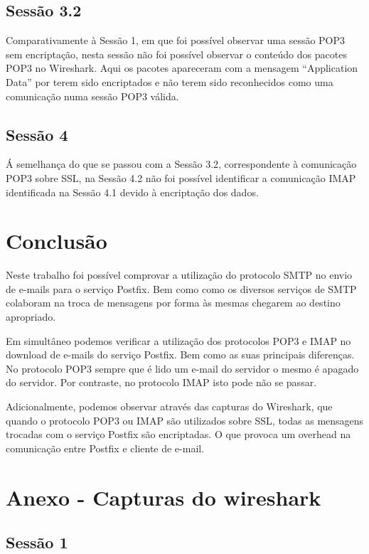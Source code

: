 \documentclass[a4paper,12pt]{article}
\begin{document}
\subsection{Sessão 3.2}

Comparativamente à Sessão 1, em que foi possível observar uma sessão POP3 sem
encriptação, nesta sessão não foi possível observar o conteúdo dos pacotes POP3
no Wireshark. Aqui os pacotes apareceram com a mensagem ``Application
Data'' por terem sido encriptados e não terem sido reconhecidos como
uma comunicação numa sessão POP3 válida.

\subsection{Sessão 4}

Á semelhança do que se passou com a Sessão 3.2, correspondente à comunicação
POP3 sobre SSL, na Sessão 4.2 não foi possível identificar a comunicação IMAP
identificada na Sessão 4.1 devido à encriptação dos dados.

\section{Conclusão}

Neste trabalho foi possível comprovar a utilização do protocolo SMTP no 
envio de e-mails para o serviço Postfix. Bem como como os diversos serviços 
de SMTP colaboram na troca de mensagens por forma às mesmas chegarem ao 
destino apropriado.

Em simultâneo podemos verificar a utilização dos protocolos POP3 e IMAP no 
download de e-mails do serviço Postfix. Bem como as suas principais diferenças. 
No protocolo POP3 sempre que é lido um e-mail do servidor o mesmo é
apagado do servidor. Por contraste, no protocolo IMAP isto pode não se passar.

Adicionalmente, podemos observar através das capturas do Wireshark, que
quando o protocolo POP3 ou IMAP são utilizados sobre SSL, todas as
mensagens trocadas com o serviço Postfix são encriptadas. O que provoca
um overhead na comunicação entre Postfix e cliente de e-mail.

\section{Anexo - Capturas do wireshark}

\subsection{Sessão 1}
{
\scriptsize

}
\end{document}

